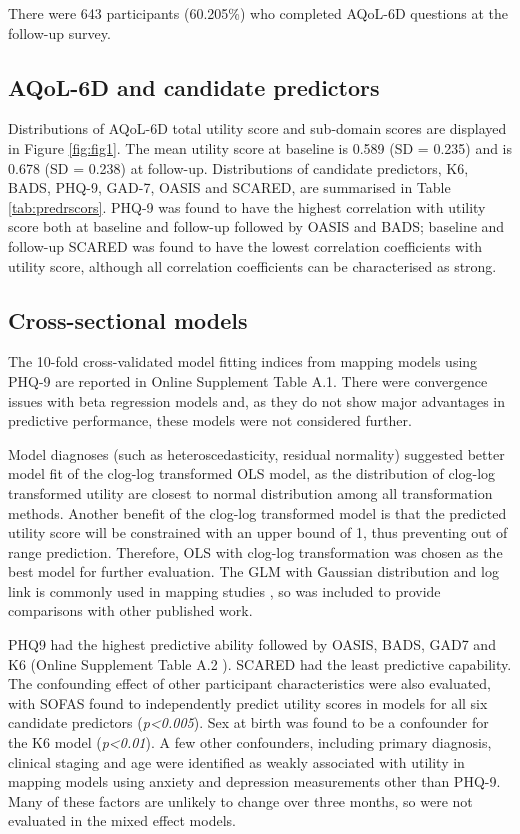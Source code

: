\documentclass[
  journal=largetwo,
  manuscript=original-article,
  year=2023-Submission,
]{cup-journal}
\begin{document}
There were 643 participants (60.205\%) who completed AQoL-6D questions at the follow-up survey.

\subsection{AQoL-6D and candidate predictors}

Distributions of AQoL-6D total utility score and sub-domain scores are displayed in Figure \ref{fig:fig1}. The mean utility score at baseline is 0.589 (SD = 0.235) and is 0.678 (SD = 0.238) at follow-up. Distributions of candidate predictors, K6, BADS, PHQ-9, GAD-7, OASIS and SCARED, are summarised in Table \ref{tab:predrscors}. PHQ-9 was found to have the highest correlation with utility score both at baseline and follow-up followed by OASIS and BADS; baseline and follow-up SCARED was found to have the lowest correlation coefficients with utility score, although all correlation coefficients can be characterised as strong.

\subsection{Cross-sectional models}

The 10-fold cross-validated model fitting indices from mapping models using PHQ-9 are reported in Online Supplement Table A.1. There were convergence issues with beta regression models and, as they do not show major advantages in predictive performance, these models were not considered further.

Model diagnoses (such as heteroscedasticity, residual normality) suggested better model fit of the clog-log transformed OLS model, as the distribution of clog-log transformed utility are closest to normal distribution among all transformation methods. Another benefit of the clog-log transformed model is that the predicted utility score will be constrained with an upper bound of 1, thus preventing out of range prediction. Therefore, OLS with clog-log transformation was chosen as the best model for further evaluation. The GLM with Gaussian distribution and log link is commonly used in mapping studies \autocite{Mukuria2019}, so was included to provide comparisons with other published work.

PHQ9 had the highest predictive ability followed by OASIS, BADS, GAD7 and K6 (Online Supplement Table A.2 ). SCARED had the least predictive capability. The confounding effect of other participant characteristics were also evaluated, with SOFAS found to independently predict utility scores in models for all six candidate predictors (\emph{p\textless0.005}). Sex at birth was found to be a confounder for the K6 model (\emph{p\textless0.01}). A few other confounders, including primary diagnosis, clinical staging and age were identified as weakly associated with utility in mapping models using anxiety and depression measurements other than PHQ-9. Many of these factors are unlikely to change over three months, so were not evaluated in the mixed effect models.
\end{document}
